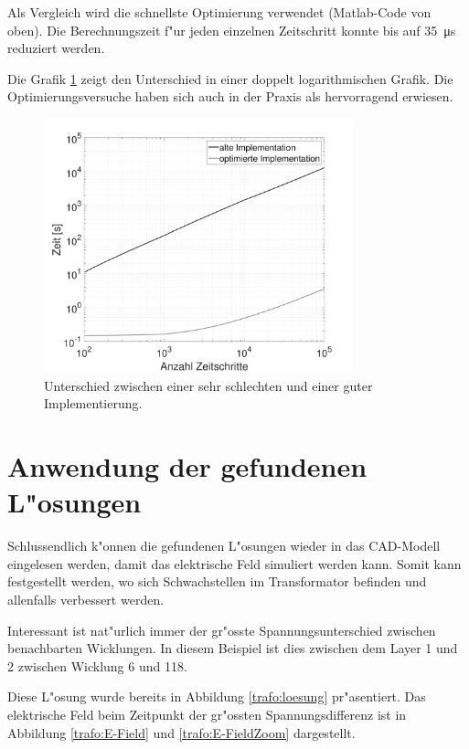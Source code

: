 \begin{refsection}
Als Vergleich wird die schnellste Optimierung verwendet (Matlab-Code von oben). Die Berechnungszeit f"ur jeden einzelnen Zeitschritt konnte bis auf \SI{35}{\micro \second} reduziert werden. 

Die Grafik \ref{trafo:Optimierung} zeigt den Unterschied in einer doppelt logarithmischen Grafik. Die Optimierungsversuche haben sich auch in der Praxis als hervorragend erwiesen.

\begin{figure}
	\centering
	\includegraphics[width=0.8\textwidth]{./trafo/images/differenceOptimization.pdf}
	\caption{Unterschied zwischen einer sehr schlechten und einer guter Implementierung.}
	\label{trafo:Optimierung}
\end{figure}

\section{Anwendung der gefundenen L"osungen}

Schlussendlich k"onnen die gefundenen L"osungen wieder in das CAD-Modell eingelesen werden, damit das elektrische Feld simuliert werden kann. Somit kann festgestellt werden, wo sich Schwachstellen im Transformator befinden und allenfalls verbessert werden.

Interessant ist nat"urlich immer der gr"osste Spannungsunterschied zwischen benachbarten Wicklungen. In diesem Beispiel ist dies zwischen dem Layer 1 und 2 zwischen Wicklung 6 und 118.

Diese L"osung wurde bereits in Abbildung \ref{trafo:loesung} pr"asentiert. Das elektrische Feld beim Zeitpunkt der gr"ossten Spannungsdifferenz ist in Abbildung \ref{trafo:E-Field} und \ref{trafo:E-FieldZoom} dargestellt. 


\end{refsection}
